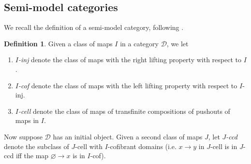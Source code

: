 \documentclass[a4paper,10pt
,draft
]{article}%
\numberwithin{equation}{section}
\numberwithin{figure}{section}
\theoremstyle{definition} %
\newtheorem{definition}[equation]{Definition}%
\newcommand{\1}{\ensuremath{\mathbbm 1}}%
\begin{document}
\subsection{Semi-model categories}

We recall the definition of a semi-model category, following \cite{Spi01,Wh16}.

\begin{definition}
      Given a class of maps $ I$ in a category $\mathcal D$, we let
      \begin{enumerate}[label = (\roman*)]
      \item \textit{$ I$-inj} denote the class of maps with the right lifting property with respect to $ I$.
      \item \textit{$ I$-cof} denote the class of maps with the left lifting property with respect to $ I$-inj.
      \item \textit{$ I$-cell} denote the class of maps of transfinite compositions of pushouts of maps in $ I$.
      \end{enumerate}

      Now suppose $\mathcal D$ has an initial object.
      Given a second class of maps $ J$, let \textit{$ J$-ccd} denote
      the subclass of $ J$-cell with $ I$-cofibrant domains
      (i.e. $x \to y$ in $ J$-cell is in $ J$-ccd iff the map $\varnothing \to x$ is in $ I$-cof).
\end{definition}
\end{document}
